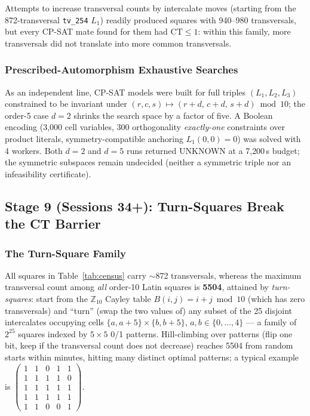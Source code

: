 \documentclass[11pt,a4paper]{article}
\theoremstyle{remark}
\newcommand{\CT}{\mathrm{CT}}
\begin{document}
Attempts to increase transversal counts by intercalate moves (starting from
the 872-transversal \texttt{tv\_254} $L_1$) readily produced squares with
940--980 transversals, but every CP-SAT mate found for them had
$\CT \leq 1$: within this family, more transversals did not translate into
more common transversals.

\subsubsection{Prescribed-Automorphism Exhaustive Searches}

As an independent line, CP-SAT models were built for full triples
$(L_1,L_2,L_3)$ constrained to be invariant under
$(r,c,s) \mapsto (r{+}d,\, c{+}d,\, s{+}d) \bmod 10$; the order-5 case $d=2$
shrinks the search space by a factor of five. A Boolean encoding
(3{,}000 cell variables, 300 orthogonality \emph{exactly-one} constraints over
product literals, symmetry-compatible anchoring $L_1(0,0)=0$) was solved with
4 workers. Both $d=2$ and $d=5$ runs returned UNKNOWN at a 7{,}200\,s budget;
the symmetric subspaces remain undecided (neither a symmetric triple nor an
infeasibility certificate).

\subsection{Stage 9 (Sessions 34+): Turn-Squares Break the CT Barrier}
\label{sec:stage9}

\subsubsection{The Turn-Square Family}

All squares in Table~\ref{tab:census} carry $\sim$872 transversals, whereas the
maximum transversal count among \emph{all} order-10 Latin squares is
\textbf{5504}, attained by \emph{turn-squares}: start from the $\mathbb{Z}_{10}$
Cayley table $B(i,j) = i{+}j \bmod 10$ (which has zero transversals) and
``turn'' (swap the two values of) any subset of the 25 disjoint intercalates
occupying cells $\{a,a{+}5\} \times \{b,b{+}5\}$, $a,b \in \{0,\dots,4\}$
--- a family of $2^{25}$ squares indexed by $5\times5$ 0/1 patterns.
Hill-climbing over patterns (flip one bit, keep if the transversal count does
not decrease) reaches 5504 from random starts within minutes, hitting many
distinct optimal patterns; a typical example is
$\left(\begin{smallmatrix}1&1&0&1&1\\1&1&1&1&0\\1&1&1&1&1\\1&1&1&1&1\\1&1&0&0&1\end{smallmatrix}\right)$.
\end{document}
